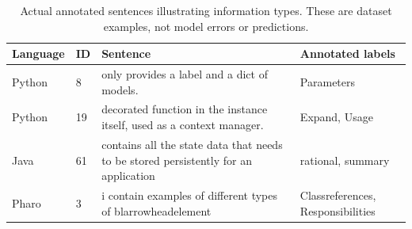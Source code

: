 \begin{table}[htbp]\centering\small
\caption{Actual annotated sentences illustrating information types. These are dataset examples, not model errors or predictions.}\label{tab:examples}
\begin{tabularx}{\linewidth}{llXX}\toprule Language & ID & Sentence & Annotated labels\\\midrule
Python & 8 & only provides a label and a dict of models. & Parameters\\
Python & 19 & decorated function in the instance itself, used as a context manager. & Expand, Usage\\
Java & 61 & contains all the state data that needs to be stored persistently for an application & rational, summary\\
Pharo & 3 & i contain examples of different types of blarrowheadelement & Classreferences, Responsibilities\\
\bottomrule\end{tabularx}\end{table}
